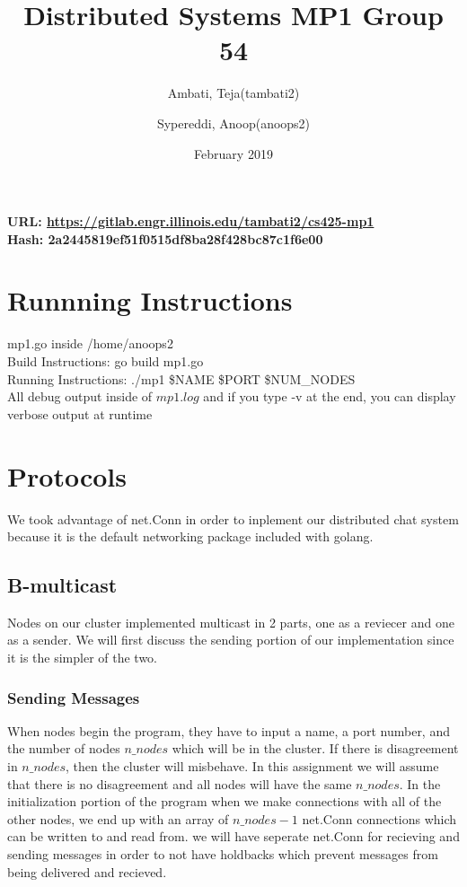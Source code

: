 \documentclass{article}
\title{Distributed Systems MP1 \textbf{Group 54}}
\author{
	Ambati, Teja(tambati2)\\
	\and
	Sypereddi, Anoop(anoops2)\\
}
\date{February 2019}
\begin{document}
	\maketitle
		\textbf{URL: \url{https://gitlab.engr.illinois.edu/tambati2/cs425-mp1}}\\
		\textbf{Hash: 2a2445819ef51f0515df8ba28f428bc87c1f6e00}
		\section{Runnning Instructions}
		mp1.go inside /home/anoops2\\
		Build Instructions: go build mp1.go\\
		Running Instructions: ./mp1 \$NAME \$PORT \$NUM\_NODES\\

		All debug output inside of $mp1.log$ and if you type -v at the end,
		you can display verbose output at runtime
    \section{Protocols}
		We took advantage of net.Conn in order to inplement our distributed
		chat system because it is the default networking package included 
		with golang. 
		\subsection{B-multicast}
		Nodes on our cluster implemented multicast in 2 parts, one as a 
		reviecer and one as a sender. We will first discuss the sending 
		portion of our implementation since it is the simpler of the two. 
			\subsubsection{Sending Messages}
				When nodes begin the program, they have to input a name, 
				a port number, and the number of nodes $n\_nodes$ which will 
				be in the cluster. If there is disagreement in $n\_nodes$, 
				then the cluster will misbehave. In this assignment we will
				assume that there is no disagreement and all nodes will have
				the same $n\_nodes$. In the initialization portion of the program
				when we make connections with all of the other nodes, we 
				end up with an array of $n\_nodes - 1$ net.Conn connections 
				which can be written to and read from.  we will have seperate 
				net.Conn for recieving and sending messages in order to not 
				have holdbacks which prevent messages from being delivered 
				and recieved. 
\end{document}
